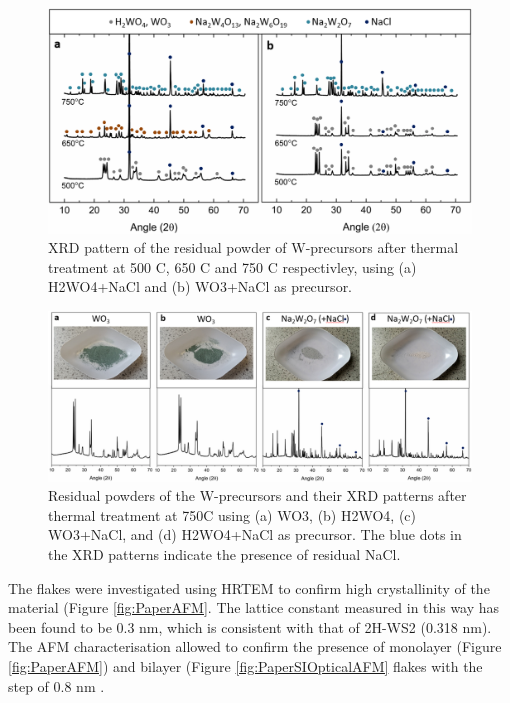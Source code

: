 
\begin{figure}[h]
\begin{center}
\includegraphics[scale=0.3]{PaperSIXRD.png}
\caption{XRD pattern of the residual powder of W-precursors after thermal treatment at 500 {\degree}C, 650 {\degree}C and 750 {\degree}C respectivley, using (a) H2WO4+NaCl and (b) WO3+NaCl as precursor.}
\label{fig:PaperSIXRD}
\end{center}
\end{figure}

\begin{figure}[h]
\begin{center}
\includegraphics[scale=0.3]{PaperSIXRDOptical.png}
\caption{Residual powders of the W-precursors and their XRD patterns after thermal treatment at 750{\degree}C using (a) WO3, (b) H2WO4, (c) WO3+NaCl, and (d) H2WO4+NaCl as precursor. The blue dots in the XRD patterns indicate the presence of residual NaCl.}
\label{fig:PaperSIXRDOptical}
\end{center}
\end{figure}

The flakes were investigated using HRTEM to confirm high crystallinity of the material (Figure \ref{fig:PaperAFM}. The lattice constant measured in this way has been found to be 0.3 nm, which is consistent with that of 2H-WS2 (0.318 nm). The AFM characterisation allowed to confirm the presence of monolayer (Figure \ref{fig:PaperAFM}) and bilayer (Figure \ref{fig:PaperSIOpticalAFM} flakes with the step of 0.8 nm \cite{Wu2014}\cite{Rasmussen2015}.

